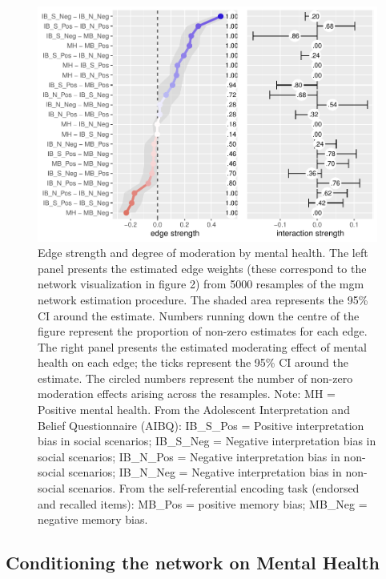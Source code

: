 \documentclass[man,floatsintext]{apa6}
\begin{document}
\begin{figure}
\centering
\includegraphics{CCBH-in-adolescence---Network-analysis_files/figure-latex/unnamed-chunk-4-1.pdf}
\caption{\label{fig:unnamed-chunk-4}Edge strength and degree of moderation by mental health. The left panel presents the estimated edge weights (these correspond to the network visualization in figure 2) from 5000 resamples of the mgm network estimation procedure. The shaded area represents the 95\% CI around the estimate. Numbers running down the centre of the figure represent the proportion of non-zero estimates for each edge. The right panel presents the estimated moderating effect of mental health on each edge; the ticks represent the 95\% CI around the estimate. The circled numbers represent the number of non-zero moderation effects arising across the resamples.
Note: MH = Positive mental health. From the Adolescent Interpretation and Belief Questionnaire (AIBQ): IB\_S\_Pos = Positive interpretation bias in social scenarios; IB\_S\_Neg = Negative interpretation bias in social scenarios; IB\_N\_Pos = Negative interpretation bias in non-social scenarios; IB\_N\_Neg = Negative interpretation bias in non-social scenarios. From the self-referential encoding task (endorsed and recalled items): MB\_Pos = positive memory bias; MB\_Neg = negative memory bias.}
\end{figure}

\hypertarget{conditioning-the-network-on-mental-health}{%
\subsection{Conditioning the network on Mental Health}\label{conditioning-the-network-on-mental-health}}
\end{document}
